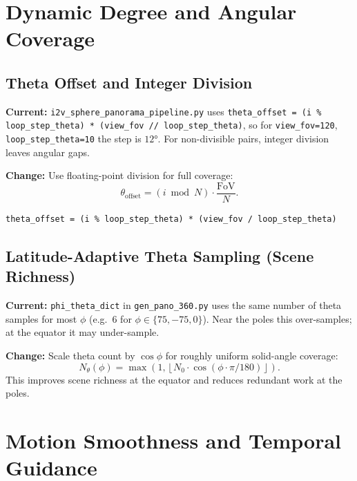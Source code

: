 \documentclass[11pt,a4paper]{article}
\newcommand{\file}[1]{\texttt{#1}}
\newcommand{\fn}[1]{\texttt{#1}}
\begin{document}
\section{Dynamic Degree and Angular Coverage}

\subsection{Theta Offset and Integer Division}

\textbf{Current:} \file{i2v\_sphere\_panorama\_pipeline.py} uses \fn{theta\_offset = (i \% loop\_step\_theta) * (view\_fov // loop\_step\_theta)}, so for \fn{view\_fov=120}, \fn{loop\_step\_theta=10} the step is $12°$. For non-divisible pairs, integer division leaves angular gaps.

\textbf{Change:} Use floating-point division for full coverage:
\begin{equation}
\theta_{\text{offset}} = (i \bmod N) \cdot \frac{\text{FoV}}{N}.
\end{equation}
\begin{lstlisting}
theta_offset = (i % loop_step_theta) * (view_fov / loop_step_theta)
\end{lstlisting}

\subsection{Latitude-Adaptive Theta Sampling (Scene Richness)}

\textbf{Current:} \fn{phi\_theta\_dict} in \file{gen\_pano\_360.py} uses the same number of theta samples for most $\phi$ (e.g.\ 6 for $\phi\in\{75,-75,0\}$). Near the poles this over-samples; at the equator it may under-sample.

\textbf{Change:} Scale theta count by $\cos\phi$ for roughly uniform solid-angle coverage:
\begin{equation}
N_\theta(\phi) = \max\left(1, \left\lfloor N_0 \cdot \cos(\phi \cdot \pi/180)\right\rfloor\right).
\end{equation}
This improves scene richness at the equator and reduces redundant work at the poles.

\section{Motion Smoothness and Temporal Guidance}
\end{document}
